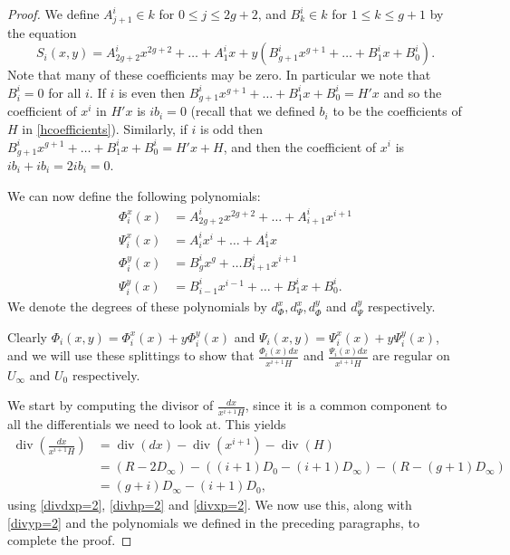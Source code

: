 \documentclass[draft, 11pt]{article} %
\theoremstyle{plain}
\theoremstyle{remark}
\DeclareMathOperator{\di}{div}
\begin{document}
\begin{proof}
We define $A^i_{j+1} \in k$ for $0 \leq j \leq 2g+2$, and $B_k^i \in k$ for $1\leq k \leq g+1$ by the equation
\[
S_i(x,y) = A_{2g+2}^ix^{2g+2} + \ldots + A^i_1 x + y(B_{g+1}^i x^{g+1} + \ldots + B_1^i x + B_0^i).
\]
Note that many of these coefficients may be zero.
In particular we note that $B_i^i = 0$ for all $i$.
If $i$ is even then $B_{g+1}^ix^{g+1} + \ldots + B_1^ix + B_0^i = H'x$ and so the coefficient of $x^i$ in $H'x$ is $ib_i = 0$ (recall that we defined $b_i$ to be the coefficients of $H$ in \eqref{hcoefficients}).
Similarly, if $i$ is odd then $B_{g+1}^ix^{g+1} + \ldots + B_1^ix + B_0^i = H'x + H$, and then the coefficient of $x^i$ is $ib_i+ ib_i = 2ib_i = 0$.


We can now define the following polynomials:
\begin{equation}\label{Split}
\begin{split}
\Phi_i^x(x) & =  A^i_{2g+2}x^{2g+2} + \ldots + A^i_{i+1}x^{i+1} \\
\Psi_i^x(x) & =  A^i_ix^i + \ldots + A^i_1x \\
\Phi_i^y(x) & =  B_g^ix^g + \ldots B_{i+1}^ix^{i+1} \\
\Psi_i^y(x) & =  B_{i-1}^ix^{i-1} + \ldots + B_1^ix + B_0^i.
\end{split}
\end{equation}
We denote the degrees of these polynomials by $d_{\Phi}^x, d_{\Psi}^x, d_{\Phi}^y$ and $d_{\Psi}^y$ respectively.

Clearly $\Phi_i(x,y) = \Phi_i^x(x) + y\Phi_i^y(x)$ and $\Psi_i (x,y)= \Psi_i^x(x) + y\Psi_i^y(x)$, and we will use these splittings to show that $\frac{ \Phi_i(x) dx}{x^{i+1}H}$ and $\frac{\Psi_i(x) dx}{x^{i+1}H}$ are regular on $U_\infty$ and $U_0$ respectively.

We start by computing the divisor of $\frac{dx}{x^{i+1}H}$, since it is a common component to all the differentials we need to look at.
This yields
\begin{align}
\di \left( \frac{dx}{x^{i+1}H} \right) & = \di(dx) - \di (x^{i+1}) - \di (H) \nonumber \\
& = (R-2D_\infty) - ((i+1)D_0 - (i+1)D_\infty) - (R - (g+1)D_\infty) \nonumber \\
& = (g+i)D_\infty - (i+1)D_0,
\end{align}
using \eqref{divdxp=2}, \eqref{divhp=2} and \eqref{divxp=2}.
We now use this, along with \eqref{divyp=2} and the polynomials we defined in the preceding paragraphs, to complete the proof.


\end{proof}
\end{document}
